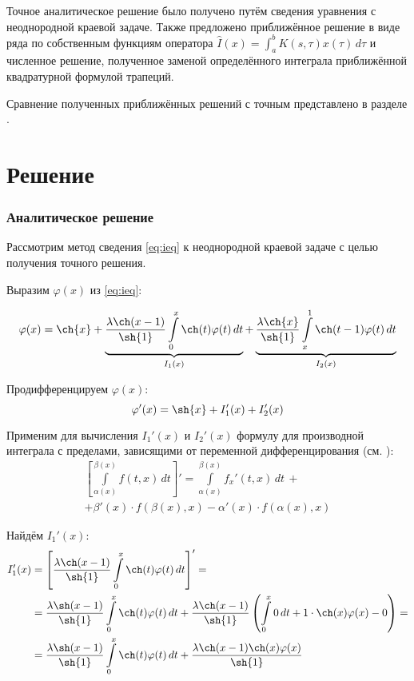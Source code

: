 \documentclass{article}
\numberwithin{equation}{section}
\renewcommand{\phi}{\varphi}
\newcommand{\intl}{\int\limits}
\begin{document}
Точное аналитическое решение было получено путём сведения уравнения с
неоднородной краевой задаче. Также предложено приближённое решение в
виде ряда по собственным функциям оператора $\hat{I}(x) =
\int_a^b{K(s, \tau) x(\tau)\, d\tau}$ и численное решение, полученное
заменой определённого интеграла приближённой квадратурной формулой
трапеций.

Сравнение полученных приближённых решений с точным представлено в
разделе \pageref{sec:comparison}.

\clearpage
\part{Решение}

\section{Аналитическое решение}

Рассмотрим метод сведения \eqref{eq:ieq} к неоднородной краевой задаче
с целью получения точного решения.

Выразим $\phi(x)$ из \eqref{eq:ieq}:

\begin{equation}
  \label{eq:phi}
  \phi(x) = \ch{x} + 
  \underbrace{\frac{\lambda \ch(x-1)}{\sh{1}}\intl_0^x{\ch(t) \phi(t)\,dt}}_{I_1(x)} +
  \underbrace{\frac{\lambda \ch{x}}{\sh{1}}\intl_x^1{\ch(t-1)\phi(t)\,dt}}_{I_2(x)}
\end{equation}

Продифференцируем $\phi(x)$:
\begin{equation*}
  \phi'(x) = \sh{x} + I_1'(x) + I_2'(x)
\end{equation*}

Применим для вычисления $I_1'(x)$ и $I_2'(x)$ формулу для производной
интеграла с пределами, зависящими от переменной дифференцирования (см.
\cite{fikhtengolz03}):
\begin{multline}\label{eq:intdiff}
  \left [ \intl_{\alpha(x)}^{\beta(x)}{f(t, x)\,dt} \right ] ' = 
  \intl_{\alpha(x)}^{\beta(x)}{{f_x}'(t, x)\,dt}\, + \\
  + \beta'(x)\cdot f(\beta(x), x) -
  \alpha'(x)\cdot f(\alpha(x), x)
\end{multline}

Найдём $I_1'(x)$:
\begin{align*}
  I_1'(x) &= \left[ \frac{\lambda \ch(x-1)}{\sh{1}}\intl_0^x{\ch(t) \phi(t)\,dt} \right] ' = \\
  &= \frac{\lambda \sh(x-1)}{\sh{1}}\intl_0^x{\ch(t)\phi(t)\,dt} +
  \frac{\lambda \ch(x-1)}{\sh{1}} \left ( \intl_0^x{0\,dt} +
    1 \cdot \ch(x) \phi(x) - 0 \right) = \\
  &= \frac{\lambda \sh(x-1)}{\sh{1}}\intl_0^x{\ch(t)\phi(t)\,dt} +
  \frac{\lambda \ch(x-1) \ch(x) \phi(x)}{\sh{1}}    
\end{align*}
\end{document}
